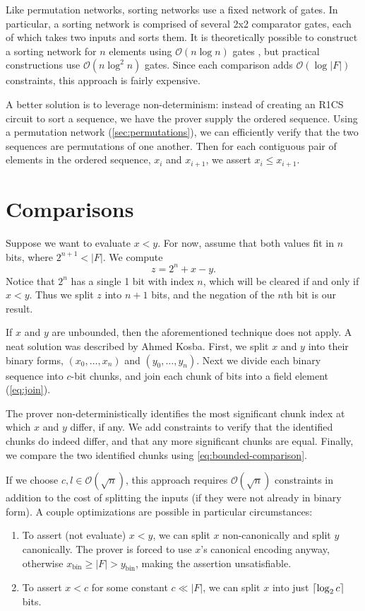 \documentclass{article}
\DeclarePairedDelimiter\ceil{\lceil}{\rceil}
\begin{document}
Like permutation networks, sorting networks use a fixed network of gates. In particular, a sorting network is comprised of several 2x2 comparator gates, each of which takes two inputs and sorts them. It is theoretically possible to construct a sorting network for $n$ elements using $\mathcal{O}(n \log n)$ gates \cite{ajtai19830}, but practical constructions use $\mathcal{O}(n \log^2 n)$ gates. Since each comparison adds $\mathcal{O}(\log |F|)$ constraints, this approach is fairly expensive.

A better solution is to leverage non-determinism: instead of creating an R1CS circuit to sort a sequence, we have the prover supply the ordered sequence. Using a permutation network (\autoref{sec:permutations}), we can efficiently verify that the two sequences are permutations of one another. Then for each contiguous pair of elements in the ordered sequence, $x_i$ and $x_{i + 1}$, we assert $x_i \le x_{i + 1}$.


\section{Comparisons} \label{sec:comparisons}

Suppose we want to evaluate $x < y$. For now, assume that both values fit in $n$ bits, where $2^{n + 1} < |F|$. We compute
\begin{equation} \label{eq:bounded-comparison}
  z = 2^n + x - y.
\end{equation}
Notice that $2^n$ has a single 1 bit with index $n$, which will be cleared if and only if $x < y$. Thus we split $z$ into $n + 1$ bits, and the negation of the $n$th bit is our result.

If $x$ and $y$ are unbounded, then the aforementioned technique does not apply. A neat solution was described by Ahmed Kosba. First, we split $x$ and $y$ into their binary forms, $(x_0, \dots, x_n)$ and $(y_0, \dots, y_n)$. Next we divide each binary sequence into $c$-bit chunks, and join each chunk of bits into a field element (\autoref{eq:join}).

The prover non-deterministically identifies the most significant chunk index at which $x$ and $y$ differ, if any. We add constraints to verify that the identified chunks do indeed differ, and that any more significant chunks are equal. Finally, we compare the two identified chunks using \autoref{eq:bounded-comparison}.

If we choose $c, l \in \mathcal{O}(\sqrt{n})$, this approach requires $\mathcal{O}(\sqrt{n})$ constraints in addition to the cost of splitting the inputs (if they were not already in binary form). A couple optimizations are possible in particular circumstances:
\begin{enumerate}
  \item To assert (not evaluate) $x < y$, we can split $x$ non-canonically and split $y$ canonically. The prover is forced to use $x$'s canonical encoding anyway, otherwise $x_\mathrm{bin} \ge |F| > y_\mathrm{bin}$, making the assertion unsatisfiable.
  \item To assert $x < c$ for some constant $c \ll |F|$, we can split $x$ into just $\ceil{\log_2 c}$ bits.
\end{enumerate}


{}

\end{document}
